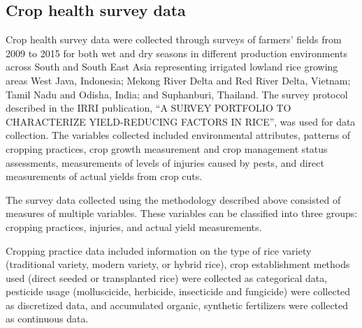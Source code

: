 \subsection*{Crop health survey data}

Crop health survey data were collected through surveys of farmers' fields from 2009 to 2015 for both wet and dry seasons in different production environments across South and South East Asia representing irrigated lowland rice growing areas West Java, Indonesia; Mekong River Delta and Red River Delta, Vietnam; Tamil Nadu and Odisha, India; and Suphanburi, Thailand. The survey protocol described in the IRRI publication, ``A SURVEY PORTFOLIO TO CHARACTERIZE YIELD-REDUCING FACTORS IN RICE'',  was used for data collection. The variables collected included environmental attributes, patterns of cropping practices, crop growth measurement and crop management status assessments, measurements of levels of injuries caused by pests, and direct measurements of actual yields from crop cuts. 

The survey data collected using the methodology described above consisted of measures of multiple variables. These variables can be classified into three groups: cropping practices, injuries, and actual yield measurements. 

Cropping practice data included information on the type of rice variety (traditional variety, modern variety, or hybrid rice), crop establishment methods used (direct seeded or transplanted rice) were collected as categorical data, pesticide usage (molluscicide, herbicide, insecticide and fungicide) were collected as discretized data, and accumulated organic, synthetic fertilizers were collected as continuous data.

